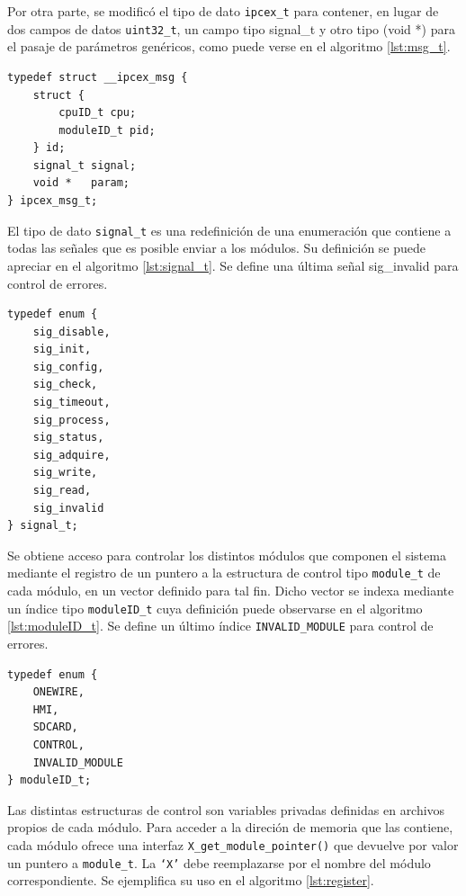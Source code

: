Por otra parte, se modificó el tipo de dato \texttt{ipcex\_t} para contener, en lugar de dos campos de datos \texttt{uint32\_t}, un campo tipo signal\_t y otro tipo (void *) para el pasaje de parámetros genéricos, como puede verse en el algoritmo \ref{lst:msg_t}. 

\vspace{10px}
\begin{lstlisting}[caption={Definición nuevo tipo de dato ipcex\_msg\_t para intercambio de mensajes.},label={lst:msg_t}]
	typedef struct __ipcex_msg {
	struct {
		cpuID_t cpu;
		moduleID_t pid;
	} id;
	signal_t signal;
	void *   param;
} ipcex_msg_t;
\end{lstlisting} 

El tipo de dato \texttt{signal\_t} es una redefinición de una enumeración que contiene a todas las señales que es posible enviar a los módulos.  Su definición se puede apreciar en el algoritmo \ref{lst:signal_t}. Se define una última señal sig\_invalid para control de errores.

\begin{lstlisting}[caption={Definición nuevo tipo de dato signal\_t para el envío de señales a los módulos.},label={lst:signal_t}]
typedef enum {
	sig_disable, 
	sig_init, 
	sig_config, 
	sig_check, 
	sig_timeout, 
	sig_process, 
	sig_status, 
	sig_adquire,  
	sig_write, 
	sig_read,
	sig_invalid
} signal_t;
\end{lstlisting}

Se obtiene acceso para controlar los distintos módulos que componen el sistema mediante el registro de un puntero a la estructura de control tipo \texttt{module\_t} de cada módulo, en un vector definido para tal fin.  Dicho vector se indexa mediante un índice tipo \texttt{moduleID\_t} cuya definición puede observarse en el algoritmo \ref{lst:moduleID_t}.  Se define un último índice \texttt{INVALID\_MODULE} para control de errores.

\begin{lstlisting}[caption={Definición nuevo tipo de dato moduleID\_t para indexar el control de los módulos.},label={lst:moduleID_t}]
typedef enum {
	ONEWIRE, 
	HMI, 
	SDCARD, 
	CONTROL, 
	INVALID_MODULE
} moduleID_t;
\end{lstlisting}

Las distintas estructuras de control son variables privadas definidas en archivos propios de cada módulo.  Para acceder a la direción de memoria que las contiene, cada módulo ofrece una interfaz \texttt{X\_get\_module\_pointer()} que devuelve por valor un puntero a \texttt{module\_t}. La \texttt{`X'} debe reemplazarse por el nombre del módulo correspondiente.  Se ejemplifica su uso en el algoritmo \ref{lst:register}.

